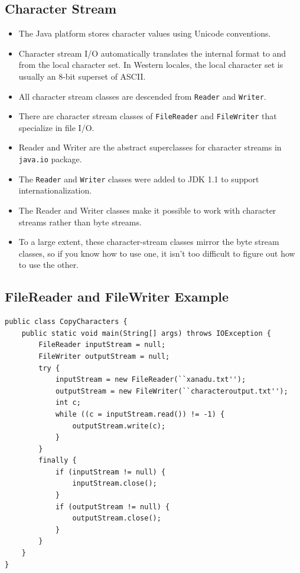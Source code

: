 \documentclass[11pt,a4paper]{article}
\begin{document}
 \subsection*{Character Stream}
 \begin{itemize}
      \item The Java platform stores character values using Unicode conventions. 
      \item Character stream I/O automatically translates the internal format to and from the local character set. In Western locales, the local character set is usually an 8-bit superset of ASCII. 
      \item All character stream classes are descended from \texttt{Reader} and \texttt{Writer}. 
      \item There are character stream classes of \texttt{FileReader} and \texttt{FileWriter} that specialize in file I/O. 
      \item Reader and Writer are the abstract superclasses for character streams in \texttt{java.io} package. 
      \item The \texttt{Reader} and \texttt{Writer} classes were added to JDK 1.1 to support internationalization. 
      \item The Reader and Writer classes make it possible to work with character streams rather than byte streams. 
      \item To a large extent, these character-stream classes mirror the byte stream classes, so if you know how to use one, it isn't too difficult to figure out how to use the other. 
  \end{itemize}

\subsection*{FileReader and FileWriter Example}
\begin{lstlisting}
public class CopyCharacters { 
    public static void main(String[] args) throws IOException { 
        FileReader inputStream = null; 
        FileWriter outputStream = null; 
        try { 
            inputStream = new FileReader(``xanadu.txt''); 
            outputStream = new FileWriter(``characteroutput.txt''); 
            int c; 
            while ((c = inputStream.read()) != -1) { 
                outputStream.write(c); 
            }
        } 
        finally { 
            if (inputStream != null) { 
                inputStream.close(); 
            } 
            if (outputStream != null) { 
                outputStream.close(); 
            } 
        } 
    } 
}
\end{lstlisting}
\end{document}
